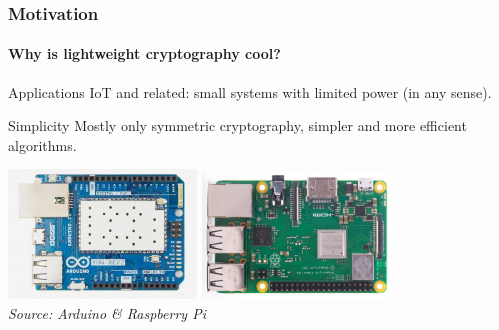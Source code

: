 \documentclass{beamer}
\begin{document}
\addtocounter{page}{1}
\begin{frame}
\addtocounter{page}{-1}
\frametitle{Motivation}
\framesubtitle{\hspace{5mm}Why is lightweight cryptography cool?} 


\begin{block}{Applications}
IoT and related: small systems with limited power (in any sense).
\end{block}

\begin{block}{Simplicity}
Mostly only symmetric cryptography, simpler and more efficient algorithms.
\end{block}

\begin{center}
\includegraphics[width=5cm]{arduino_yun.jpg}%
\includegraphics[width=5cm]{raspi.jpg}%
\\
\textit{\footnotesize{Source: Arduino \& Raspberry Pi}}

\end{center}

\end{frame}
\end{document}
